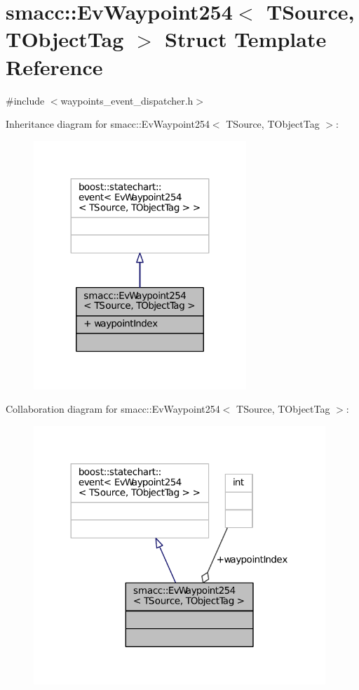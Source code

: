 \hypertarget{structsmacc_1_1EvWaypoint254}{}\section{smacc\+:\+:Ev\+Waypoint254$<$ T\+Source, T\+Object\+Tag $>$ Struct Template Reference}
\label{structsmacc_1_1EvWaypoint254}


{\ttfamily \#include $<$waypoints\+\_\+event\+\_\+dispatcher.\+h$>$}



Inheritance diagram for smacc\+:\+:Ev\+Waypoint254$<$ T\+Source, T\+Object\+Tag $>$\+:
\nopagebreak
\begin{figure}[H]
\begin{center}
\leavevmode
\includegraphics[width=227pt]{structsmacc_1_1EvWaypoint254__inherit__graph}
\end{center}
\end{figure}


Collaboration diagram for smacc\+:\+:Ev\+Waypoint254$<$ T\+Source, T\+Object\+Tag $>$\+:
\nopagebreak
\begin{figure}[H]
\begin{center}
\leavevmode
\includegraphics[width=312pt]{structsmacc_1_1EvWaypoint254__coll__graph}
\end{center}
\end{figure}
